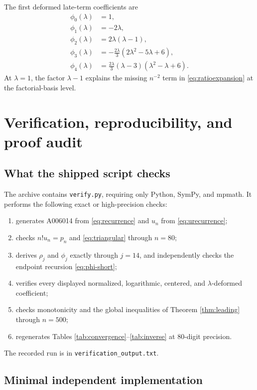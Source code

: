 \documentclass[11pt,a4paper]{article}
\theoremstyle{definition}
\theoremstyle{remark}
\begin{document}
The first deformed late-term coefficients are
\begin{equation}\label{eq:lambdaphi}
\begin{split}
 \phi_0(\lambda)&=1,\\
 \phi_1(\lambda)&=-2\lambda,\\
 \phi_2(\lambda)&=2\lambda(\lambda-1),\\
 \phi_3(\lambda)&=-\frac{2\lambda}{3}(2\lambda^2-5\lambda+6),\\
 \phi_4(\lambda)&=\frac{2\lambda}{3}(\lambda-3)(\lambda^2-\lambda+6).
\end{split}
\end{equation}
At \(\lambda=1\), the factor \(\lambda-1\) explains the missing \(n^{-2}\) term in \eqref{eq:ratioexpansion} at the factorial-basis level.

\section{Verification, reproducibility, and proof audit}

\subsection{What the shipped script checks}

The archive contains \texttt{verify.py}, requiring only Python, SymPy, and mpmath.  It performs the following exact or high-precision checks:
\begin{enumerate}
\item generates A006014 from \eqref{eq:recurrence} and \(u_n\) from \eqref{eq:urecurrence};
\item checks \(n!u_n=p_n\) and \eqref{eq:triangular} through \(n=80\);
\item derives \(\rho_j\) and \(\phi_j\) exactly through \(j=14\), and independently checks the endpoint recursion \eqref{eq:phi-short};
\item verifies every displayed normalized, logarithmic, centered, and \(\lambda\)-deformed coefficient;
\item checks monotonicity and the global inequalities of Theorem \ref{thm:leading} through \(n=500\);
\item regenerates Tables \ref{tab:convergence}--\ref{tab:inverse} at 80-digit precision.
\end{enumerate}
The recorded run is in \texttt{verification\_output.txt}.

\subsection{Minimal independent implementation}
\end{document}
